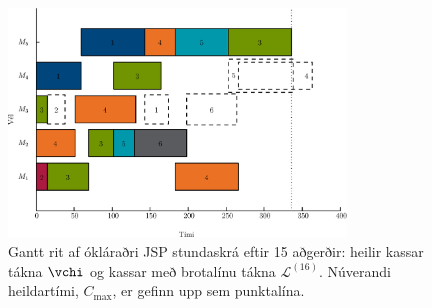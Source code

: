 \documentclass[]{article}
\begin{document}
\begin{figure}\centering
    \includegraphics[width=0.8\textwidth]{figures/jssp_example.eps}
    \caption[Gantt rit af ókláraðri JSP stundaskrá]{Gantt rit af ókláraðri JSP 
    stundaskrá eftir 15 aðgerðir: heilir kassar tákna $\vchi$ og kassar með 
    brotalínu tákna $\mathcal{L}^{(16)}$. 
    Núverandi heildartími, $C_{\max}$, er gefinn upp sem punktalína.}
    \label{fig:jssp:example}
\end{figure}
\end{document}

